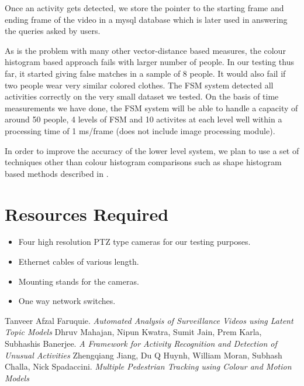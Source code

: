 \documentclass[a4paper]{article}
\begin{document}
Once an activity gets detected, we store the pointer to the starting frame and ending frame of the video in a mysql database which is 
later used in answering the queries asked by users.

As is the problem with many other vector-distance based measures, the colour histogram based approach fails with larger number of people. 
In our testing thus far, it started giving false matches in a sample of 8 people. It would also fail if two people wear very similar 
colored clothes. The FSM system detected all activities correctly on the very small dataset we tested. On the basis of time measurements 
we have done, the FSM system will be able to handle a capacity of around 50 people, 4 levels of FSM and 10 activites at each level well 
within a processing time of 1 ms/frame (does not include image processing module).

In order to improve the accuracy of the lower level system, we plan to use a set of techniques other than colour histogram comparisons 
such as shape histogram based methods described in \cite[Sec II.C]{jiang}.

\section{Resources Required} 
\begin{itemize}
\item Four high resolution PTZ type cameras for our testing purposes.
\item Ethernet cables of various length.
\item Mounting stands for the cameras.
\item One way network switches.
\end{itemize}

\begin{thebibliography}{9}
 Tanveer Afzal Faruquie. \emph{Automated Analysis of Surveillance Videos using Latent Topic Models}
 Dhruv Mahajan, Nipun Kwatra, Sumit Jain, Prem Karla, Subhashis Banerjee. \emph{A Framework for Activity Recognition and 
Detection of Unusual Activities} 
 Zhengqiang Jiang, Du Q Huynh, William Moran, Subhash Challa, Nick Spadaccini. \emph{Multiple Pedestrian Tracking using 
Colour and Motion Models}
\end{thebibliography}
\end{document}
